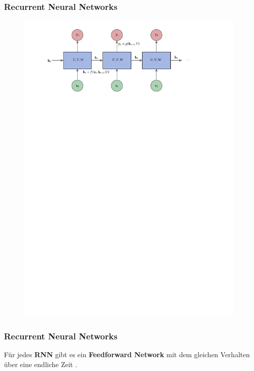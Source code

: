 \documentclass[aspectratio=169]{beamer}
\begin{document}
\begin{frame}
	\frametitle{Recurrent Neural Networks}
	\begin{figure}
		\includegraphics[scale=0.9]{rnn-diagram-unfold}
	\end{figure}
\end{frame}

\begin{frame}
	\frametitle{Recurrent Neural Networks}
	\begin{theorem}
		Für jedes \textbf{RNN} gibt es ein \textbf{Feedforward Network} mit dem gleichen Verhalten über eine endliche Zeit \cite{Rumelhart1987}.
	\end{theorem}
\end{frame}
\end{document}
